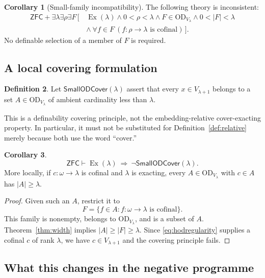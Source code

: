 \documentclass[11pt,letterpaper]{article}
\theoremstyle{definition}
\newtheorem{definition}{Definition}[section]
\newtheorem{corollary}[definition]{Corollary}
\newcommand{\ZFC}{\mathsf{ZFC}}
\newcommand{\OD}{\mathrm{OD}}
\newcommand{\Ex}{\operatorname{Ex}}
\begin{document}
\begin{corollary}[Small-family incompatibility]\label{cor:smallfamily}
The following theory is inconsistent:
\[
\begin{split}
 \ZFC+\exists\lambda\exists\rho\exists F\,[\,&\Ex(\lambda)
 \wedge 0<\rho<\lambda\wedge F\in\OD_{V_\lambda}\wedge 0<|F|<\lambda\\
 &\wedge\ \forall f\in F\ (f:\rho\to\lambda\text{ is cofinal})\,].
\end{split}
\]
No definable selection of a member of $F$ is required.
\end{corollary}

\subsection{A local covering formulation}

\begin{definition}
Let $\mathsf{SmallODCover}(\lambda)$ assert that every
$x\in V_{\lambda+1}$ belongs to a set $A\in\OD_{V_\lambda}$ of ambient
cardinality less than $\lambda$.
\end{definition}

This is a definability covering principle, not the embedding-relative
cover-exacting property. In particular, it must not be substituted for
Definition~\ref{def:relative} merely because both use the word ``cover.''

\begin{corollary}\label{cor:odcover}
\[
 \ZFC\vdash
 \Ex(\lambda)\ \Longrightarrow\ \neg\mathsf{SmallODCover}(\lambda).
\]
More locally, if $c:\omega\to\lambda$ is cofinal and $\lambda$ is
exacting, every $A\in\OD_{V_\lambda}$ with $c\in A$ has
$|A|\geq\lambda$.
\end{corollary}

\begin{proof}
Given such an $A$, restrict it to
\[
 F=\{f\in A:f:\omega\to\lambda\text{ is cofinal}\}.
\]
This family is nonempty, belongs to $\OD_{V_\lambda}$, and is a subset
of $A$. Theorem~\ref{thm:width} implies $|A|\geq|F|\geq\lambda$.
Since \eqref{eq:hodregularity} supplies a cofinal $c$ of rank $\lambda$,
we have $c\in V_{\lambda+1}$ and the covering principle fails.
\end{proof}

\subsection{What this changes in the negative programme}
\end{document}
